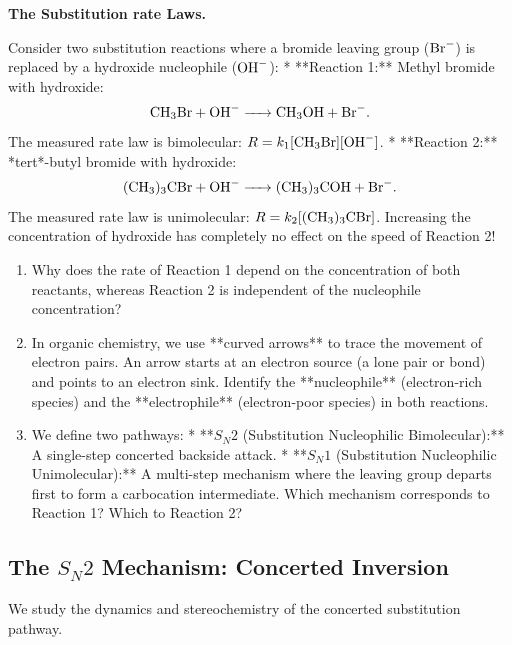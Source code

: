 \documentclass[12pt, a4paper]{book}
\begin{document}
\begin{puzzlebox}
\textbf{The Substitution rate Laws.}

Consider two substitution reactions where a bromide leaving group ($\ce{Br-}$) is replaced by a hydroxide nucleophile ($\ce{OH-}$):
* **Reaction 1:** Methyl bromide with hydroxide:
  \[
    \ce{CH3Br + OH- -> CH3OH + Br-}.
  \]
  The measured rate law is bimolecular: $R = k_1 [\ce{CH3Br}][\ce{OH-}]$.
* **Reaction 2:** *tert*-butyl bromide with hydroxide:
  \[
    \ce{(CH3)3CBr + OH- -> (CH3)3COH + Br-}.
  \]
  The measured rate law is unimolecular: $R = k_2 [\ce{(CH3)3CBr}]$.
  Increasing the concentration of hydroxide has completely no effect on the speed of Reaction 2!
\begin{enumerate}[label=(\alph*), leftmargin=*]
  \item Why does the rate of Reaction 1 depend on the concentration of both reactants, whereas Reaction 2 is independent of the nucleophile concentration?
  \item In organic chemistry, we use **curved arrows** to trace the movement of electron pairs. An arrow starts at an electron source (a lone pair or bond) and points to an electron sink.
        Identify the **nucleophile** (electron-rich species) and the **electrophile** (electron-poor species) in both reactions.
  \item We define two pathways:
        * **$S_N2$ (Substitution Nucleophilic Bimolecular):** A single-step concerted backside attack.
        * **$S_N1$ (Substitution Nucleophilic Unimolecular):** A multi-step mechanism where the leaving group departs first to form a carbocation intermediate.
        Which mechanism corresponds to Reaction 1? Which to Reaction 2?
\end{enumerate}
\end{puzzlebox}

\subsection{The $S_N2$ Mechanism: Concerted Inversion}

We study the dynamics and stereochemistry of the concerted substitution pathway.
\end{document}

